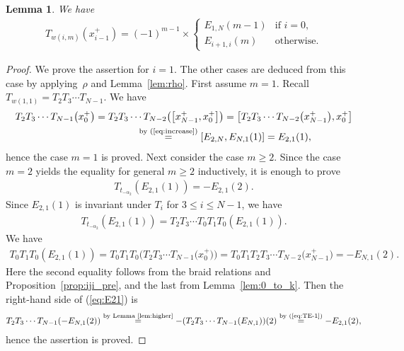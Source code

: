 \documentclass[pdftex]{sigma}
\newtheorem{lem}[thm]{Lemma}
\theoremstyle{definition}
\numberwithin{equation}{section}
\begin{document}
\begin{lem}\label{lem:classical_part} We have
\begin{gather*} T_{w(i,m)}(x_{i-1}^+) = (-1)^{m-1} \times \begin{cases}
E_{1,N}(m-1) & \text{if $i=0$},\\
E_{i+1,i}(m) & \text{otherwise}.
\end{cases}
\end{gather*}
\end{lem}
\begin{proof}We prove the assertion for $i=1$. The other cases are deduced from this case by applying~$\rho$ and Lemma~\ref{lem:rho}. First assume $m=1$. Recall $T_{w(1,1)}=T_2 T_3 \cdots T_{N-1}$. We have
\begin{gather*}
T_2 T_3 \cdots T_{N-1}\big(x_0^+\big) = T_2 T_3 \cdots T_{N-2} \big(\big[x_{N-1}^+,x_0^+\big]\big) = \big[T_2 T_3 \cdots T_{N-2} \big(x_{N-1}^+\big),x_0^+\big] \\
\hphantom{T_2 T_3 \cdots T_{N-1}\big(x_0^+\big)}{} \overset{\text{by (\ref{eq:increase})}}{=} [E_{2,N}, E_{N,1}(1)] = E_{2,1}(1),
\end{gather*}
hence the case $m=1$ is proved. Next consider the case $m \geq 2$. Since the case $m=2$ yields the equality for general $m \geq 2$ inductively, it is enough to prove
\begin{gather*}
T_{t_{-\alpha_2}}(E_{2,1}(1))=-E_{2,1}(2).
\end{gather*}
Since $E_{2,1}(1)$ is invariant under $T_i$ for $3 \leq i \leq N-1$, we have
\begin{gather}
T_{t_{-\alpha_2}}(E_{2,1}(1)) = T_2 T_3 \cdots T_0 T_1 T_0 (E_{2,1}(1)).\label{eq:E21}
\end{gather}
We have
\begin{gather*}
T_0 T_1 T_0 (E_{2,1}(1)) = T_0 T_1 T_0 \big(T_2 T_3 \cdots T_{N-1}\big(x_0^+\big)\big) = T_0 T_1 T_2 T_3 \cdots T_{N-2}\big(x_{N-1}^+\big) = -E_{N,1}(2).
\end{gather*}
Here the second equality follows from the braid relations and Proposition~\ref{prop:iji_pre}, and the last from Lemma~\ref{lem:0_to_k}. Then the right-hand side of (\ref{eq:E21}) is
\begin{gather*}
T_2 T_3 \cdots T_{N-1} (-E_{N,1}(2)) \overset{\text{by Lemma~\ref{lem:higher}}}{=} - (T_2 T_3 \cdots T_{N-1} (E_{N,1}) )(2) \overset{\text{by (\ref{eq:TE-1})}}{=} -E_{2,1}(2),
\end{gather*}
hence the assertion is proved.
\end{proof}
\end{document}
